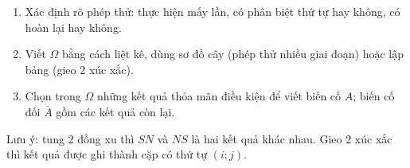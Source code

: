 \begin{enumerate}
\item Xác định rõ phép thử: thực hiện mấy lần, có phân biệt thứ tự hay không, có hoàn lại hay không.
\item Viết $\Omega$ bằng cách liệt kê, dùng sơ đồ cây (phép thử nhiều giai đoạn) hoặc lập bảng (gieo $2$ xúc xắc).
\item Chọn trong $\Omega$ những kết quả thỏa mãn điều kiện để viết biến cố $A$; biến cố đối $\overline{A}$ gồm các kết quả còn lại.
\end{enumerate}
Lưu ý: tung $2$ đồng xu thì $SN$ và $NS$ là hai kết quả khác nhau. Gieo $2$ xúc xắc thì kết quả được ghi thành cặp có thứ tự $(i;j)$.
